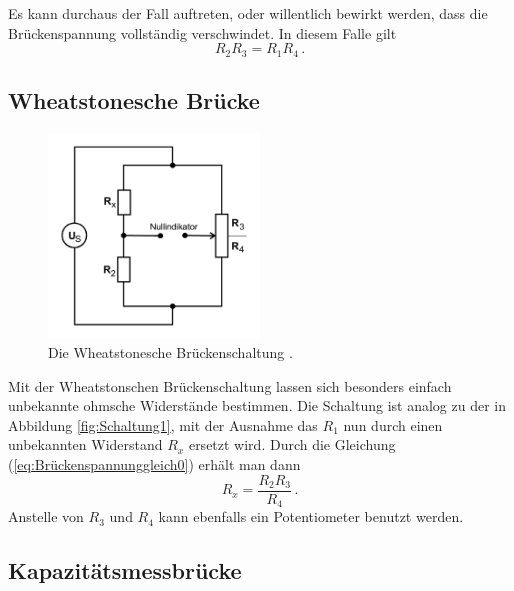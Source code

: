 Es kann durchaus der Fall auftreten, oder willentlich bewirkt werden, dass die Brückenspannung vollständig verschwindet.
In diesem Falle gilt
\begin{equation} \label{eq:Brückenspannunggleich0}
    R_2 R_3 = R_1 R_4 \, .
\end{equation}

\subsection{Wheatstonesche Brücke}

\begin{figure}
    \centering
    \includegraphics[width=0.5\textwidth]{pictures/schaltung2.pdf}
    \caption{Die Wheatstonesche Brückenschaltung \cite[4]{v302}.}
    \label{fig:Schaltung2}
\end{figure}

Mit der Wheatstonschen Brückenschaltung lassen sich besonders einfach unbekannte ohmsche Widerstände bestimmen.
Die Schaltung ist analog zu der in Abbildung \ref{fig:Schaltung1}, mit der Ausnahme das $R_1$ nun durch einen unbekannten Widerstand
$R_x$ ersetzt wird.
Durch die Gleichung (\ref{eq:Brückenspannunggleich0}) erhält man dann 
\begin{equation} \label{eq:Rx}
    R_x = \frac {R_2 R_3}{R_4} \, .
\end{equation}
Anstelle von $R_3$ und $R_4$ kann ebenfalls ein Potentiometer benutzt werden.

\subsection{Kapazitätsmessbrücke}

